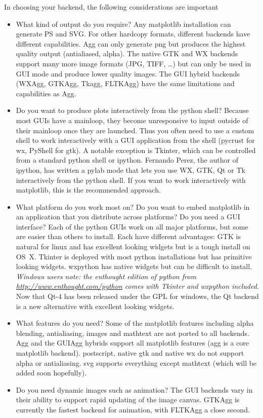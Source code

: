 \documentclass[twoside]{book}
\begin{document}
In choosing your backend, the following considerations are important

\begin{itemize}
\item What kind of output do you require?  Any matplotlib installation
  can generate PS and SVG.  For other hardcopy formats, different
  backends have different capabilities.  Agg can only generate png but
  produces the highest quality output (antialiased, alpha).  The
  native GTK and WX backends support many more image formats (JPG,
  TIFF, \dots) but can only be used in GUI mode and produce lower
  quality images.  The GUI hybrid backends (WXAgg, GTKAgg, Tkagg,
  FLTKAgg) have the same limitations and capabilities as Agg.
  
\item Do you want to produce plots interactively from the python
  shell?  Because most GUIs have a mainloop, they become unresponsive
  to input outside of their mainloop once they are launched.  Thus you
  often need to use a custom shell to work interactively with a GUI
  application from the shell (pycrust for wx, PyShell for gtk).  A
  notable exception is Tkinter, which can be controlled from a
  standard python shell or ipython.  Fernando Perez, the author of
  ipython, has written a pylab mode that lets you use WX, GTK, Qt or Tk
  interactively from the python shell.  If you want to work
  interactively with matplotlib, this is the recommended approach.

\item What platform do you work most on?  Do you want to embed
  matplotlib in an application that you distribute across platforms?
  Do you need a GUI interface?  Each of the python GUIs work on all
  major platforms, but some are easier than others to install.  Each
  have different advantages: GTK is natural for linux and has
  excellent looking widgets but is a tough install on OS~X.  Tkinter
  is deployed with most python installations but has primitive looking
  widgets.  wxpython has native widgets but can be difficult to
  install.  \textit{Windows users note: the enthought edition of
  python from \url{http://www.enthought.com/python} comes with Tkinter
  and wxpython included}. Now that Qt-4 has been released under the 
 GPL for windows, the Qt backend is a new alternative with excellent 
 looking widgets.
  
\item What features do you need?  Some of the matplotlib features
  including alpha blending, antialiasing, images and mathtext are not
  ported to all backends.  Agg and the GUIAgg hybrids support all
  matplotlib features (agg is a core matplotlib backend).  postscript,
  native gtk and native wx do not support alpha or antialiasing.  svg
  supports everything except mathtext (which will be added soon
  hopefully).

\item Do you need dynamic images such as animation?  The GUI backends
  vary in their ability to support rapid updating of the image
  canvas.  GTKAgg is currently the fastest backend for animation,
  with FLTKAgg a close second.
\end{itemize}
\end{document}
